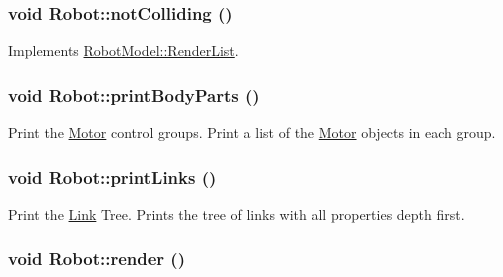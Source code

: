 \label{class_robot_model_1_1_robot_ad2827f8919f3cce0d39b89fb3fb33217}
\hypertarget{class_robot_model_1_1_robot_af9d5c7808f2d11ec66d905bb8606447e}{
\subsubsection[{notColliding}]{\setlength{\rightskip}{0pt plus 5cm}void Robot::notColliding ()}}
\label{class_robot_model_1_1_robot_af9d5c7808f2d11ec66d905bb8606447e}


Implements \hyperlink{class_robot_model_1_1_render_list_a78436c997913ce9ad41a9bd1da9b3d96}{RobotModel::RenderList}.\hypertarget{class_robot_model_1_1_robot_ad67fe62de4ea2b7b6da0521fc0bf0e5a}{
\subsubsection[{printBodyParts}]{\setlength{\rightskip}{0pt plus 5cm}void Robot::printBodyParts ()}}
\label{class_robot_model_1_1_robot_ad67fe62de4ea2b7b6da0521fc0bf0e5a}


Print the \hyperlink{class_robot_model_1_1_motor}{Motor} control groups. Print a list of the \hyperlink{class_robot_model_1_1_motor}{Motor} objects in each group. \hypertarget{class_robot_model_1_1_robot_a791f90ebca15e9a1e61e9e903f7dc594}{
\subsubsection[{printLinks}]{\setlength{\rightskip}{0pt plus 5cm}void Robot::printLinks ()}}
\label{class_robot_model_1_1_robot_a791f90ebca15e9a1e61e9e903f7dc594}


Print the \hyperlink{class_robot_model_1_1_link}{Link} Tree. Prints the tree of links with all properties depth first. \hypertarget{class_robot_model_1_1_robot_a47e480a4cad58266d12efce34f3fb563}{
\subsubsection[{render}]{\setlength{\rightskip}{0pt plus 5cm}void Robot::render ()}}
\label{class_robot_model_1_1_robot_a47e480a4cad58266d12efce34f3fb563}


